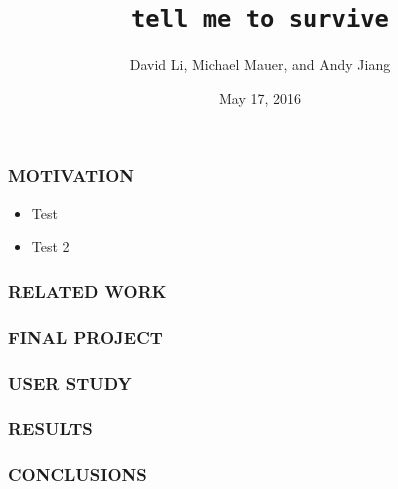 \documentclass{beamer}
\title{\texttt{tell me to survive}}
\author{David Li, Michael Mauer, and Andy Jiang}
\institute{Cornell University}
\date{May 17, 2016}
\let\theframetitle\frametitle
\renewcommand\frametitle[1]{\theframetitle{\MakeUppercase{#1}}}
\begin{document}
\frame{\titlepage}

\begin{frame}
\frametitle{Motivation}

\begin{itemize}[<+->]
\item Test
\item Test 2
\end{itemize}
\end{frame}

\begin{frame}
\frametitle{Related Work}
\end{frame}

\begin{frame}
\frametitle{Final Project}
\end{frame}

\begin{frame}
\frametitle{User Study}
\end{frame}

\begin{frame}
\frametitle{Results}
\end{frame}

\begin{frame}
\frametitle{Conclusions}
\end{frame}
\end{document}
